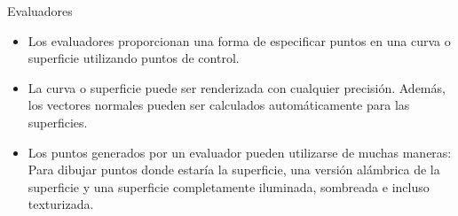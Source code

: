 \documentclass[10.5pt]{beamer}
\begin{document}
\begin{frame}{Evaluadores}
\begin{itemize}
\justifying
    \item Los evaluadores proporcionan una forma de especificar puntos en una curva o superficie utilizando puntos de control.
    \item   La curva o superficie puede ser renderizada con cualquier precisión. Además, los vectores normales pueden ser calculados automáticamente para las superficies.
    \item  Los puntos generados por un evaluador pueden utilizarse de muchas maneras: Para dibujar puntos donde estaría la superficie, una versión alámbrica de la superficie y una superficie completamente iluminada, sombreada e incluso texturizada.
\end{itemize}
\end{frame}
\end{document}
